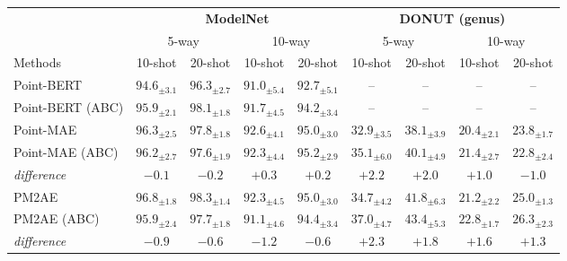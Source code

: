 \begin{table}
\begin{center}
\begin{tabular}{l|cccc|cccc}
    
\toprule
& \multicolumn{4}{c|}{\textbf{ModelNet}} & \multicolumn{4}{c}{\textbf{DONUT (genus)}} \\
& \multicolumn{2}{c}{5-way} & \multicolumn{2}{c|}{10-way} & \multicolumn{2}{c}{5-way} & \multicolumn{2}{c}{10-way} \\
\cmidrule(lr){2-3} \cmidrule(lr){4-5} \cmidrule(lr){6-7} \cmidrule(lr){8-9}
Methods & 10-shot & 20-shot & 10-shot & 20-shot & 10-shot & 20-shot & 10-shot & 20-shot \\
\midrule

Point-BERT~\cite{pbert} & $94.6_{\pm 3.1}$ & $96.3_{\pm 2.7}$ & $91.0_{\pm 5.4}$ & $92.7_{\pm 5.1}$ & -- & -- & -- & --\\
Point-BERT (ABC) & $95.9_{\pm 2.1}$ & $98.1_{\pm 1.8}$ & $91.7_{\pm 4.5}$ & $94.2_{\pm 3.4}$ & -- & -- & -- & --\\
\midrule
Point-MAE~\cite{pmae} & $96.3_{\pm 2.5}$ & $97.8_{\pm 1.8}$ & $92.6_{\pm 4.1}$ & $95.0_{\pm 3.0}$ & $32.9_{\pm 3.5}$ & $38.1_{\pm 3.9}$ & $20.4_{\pm 2.1}$ & $23.8_{\pm 1.7}$ \\
Point-MAE (ABC) & $96.2_{\pm 2.7}$ & $97.6_{\pm 1.9}$ & $92.3_{\pm 4.4}$ & $95.2_{\pm 2.9}$ & $35.1_{\pm 6.0}$ & $40.1_{\pm 4.9}$ & $21.4_{\pm 2.7}$ & $22.8_{\pm 2.4}$\\
\textit{difference} & \cellcolor{orange!25}$-0.1$ & \cellcolor{orange!25}$-0.2$ & \cellcolor{green!25}$+0.3$ & \cellcolor{green!25}$+0.2$ & \cellcolor{green!25}$+2.2$ & \cellcolor{green!25}$+2.0$ & \cellcolor{green!25}$+1.0$ & \cellcolor{orange!25}$-1.0$ \\
\midrule
PM2AE~\cite{pm2ae} & $96.8_{\pm 1.8}$ & $98.3_{\pm 1.4}$ & $92.3_{\pm 4.5}$ & $95.0_{\pm 3.0}$ & $34.7_{\pm 4.2}$ & $41.8_{\pm 6.3}$ & $21.2_{\pm 2.2}$ & $25.0_{\pm 1.3}$\\
PM2AE (ABC) & $95.9_{\pm 2.4}$ &$97.7_{\pm 1.8}$ & $91.1_{\pm 4.6}$ & $94.4_{\pm 3.4}$ & $37.0_{\pm 4.7}$ & $43.4_{\pm 5.3}$ & $22.8_{\pm 1.7}$ & $26.3_{\pm 2.3}$\\
\textit{difference} & \cellcolor{orange!25}$-0.9$ & \cellcolor{orange!25}$-0.6$ & \cellcolor{orange!25}$-1.2$ & \cellcolor{orange!25}$-0.6$ & \cellcolor{green!25}$+2.3$ & \cellcolor{green!25}$+1.8$ & \cellcolor{green!25}$+1.6$ & \cellcolor{green!25}$+1.3$ \\

\end{tabular}
\end{center}
\end{table}
